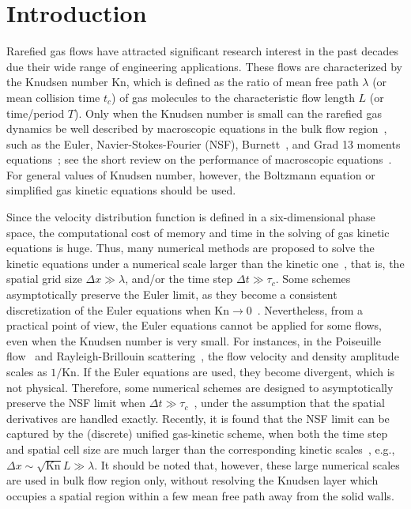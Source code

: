 \documentclass[onefignum,onetabnum]{siamart171218}
\begin{document}
\section{Introduction}


Rarefied gas flows have attracted significant research interest in the past decades due their wide range of  engineering applications. These flows are characterized by the Knudsen number $\text{Kn}$, which is defined as the ratio of  mean free path $\lambda$ (or mean collision time $t_c$) of gas molecules to the characteristic flow length $L$ (or time/period $T$). Only when the Knudsen number is small can the rarefied gas dynamics be well described by macroscopic equations in the bulk flow region~\cite{Sone2002Book}, such as the Euler, Navier-Stokes-Fourier (NSF), Burnett~\cite{CE}, and Grad 13 moments equations~\cite{Grad1949}; see the short review on the performance of macroscopic equations~\cite{Wu2020AIA}. For general values of Knudsen number, however, the Boltzmann equation or simplified gas kinetic equations should be used. 


Since the velocity distribution function is defined in a six-dimensional phase space, the computational cost of memory and time in the solving of gas kinetic equations is huge. Thus, many numerical methods are proposed to solve the kinetic equations under a numerical scale larger than the kinetic one~\cite{Luc2000JCP,Filbet2010JCP,Filbet2011,Dimarco2017Siam,Ju2017JSC,UGKS2010JCP,guo2013discrete}, that is, the spatial grid size $\Delta{x}\gg\lambda$, and/or the time step $\Delta{t}\gg\tau_c$. Some schemes asymptotically preserve the Euler limit, as they become a consistent discretization of the Euler equations when $\text{Kn}\rightarrow0$~\cite{Filbet2010JCP,Filbet2011}. 
Nevertheless, from a practical point of view, the Euler equations cannot be applied for some flows, even when the Knudsen number is very small. For instances, in the Poiseuille flow~\cite{WANG201833} and Rayleigh-Brillouin scattering~\cite{Su2020SIAM}, the flow velocity and density amplitude scales as $1/\text{Kn}$. If the Euler equations are used, they become divergent, which is not physical.
Therefore, some numerical schemes are designed to asymptotically preserve the NSF limit when $\Delta{t}\gg\tau_c$~\cite{Dimarco2017Siam,Ju2017JSC}, under the assumption that the spatial derivatives are handled exactly. Recently, it is found that the NSF limit can be captured by the (discrete) unified gas-kinetic scheme,  when both the time step and spatial cell size are much larger than the corresponding kinetic scales~\cite{UGKS2010JCP,guo2013discrete,Guo2019UP_arXiv,Zhu2019JCP}, e.g., $\Delta{x}\sim\sqrt{\text{Kn}}L\gg\lambda$. 
It should be noted that, however, these large numerical scales are used in bulk flow region only, without resolving the Knudsen layer which occupies a spatial region within a few mean free path away from the solid walls.
\end{document}
